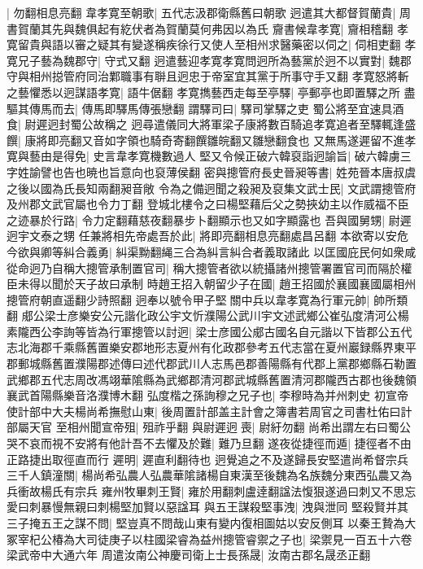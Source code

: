 |{
	勿翻相息亮翻}
韋孝寛至朝歌|{
	五代志汲郡衛縣舊曰朝歌}
迥遣其大都督賀蘭貴|{
	周書賀蘭其先與魏俱起有紇伏者為賀蘭莫何弗因以為氏}
齎書候韋孝寛|{
	齎相稽翻}
孝寛留貴與語以審之疑其有變遂稱疾徐行又使人至相州求醫藥密以伺之|{
	伺相吏翻}
孝寛兄子藝為魏郡守|{
	守式又翻}
迥遣藝迎孝寛孝寛問迥所為藝黨於迥不以實對|{
	魏郡守與相州搃管府同治鄴職事有聨且迥忠于帝室宜其黨于所事守手又翻}
孝寛怒將斬之藝懼悉以迥謀語孝寛|{
	語牛倨翻}
孝寛擕藝西走每至亭驛|{
	亭郵亭也即置驛之所}
盡驅其傳馬而去|{
	傳馬即驛馬傳張戀翻}
謂驛司曰|{
	驛司掌驛之吏}
蜀公將至宜速具酒食|{
	尉遲迥封蜀公故稱之}
迥尋遣儀同大將軍梁子康將數百騎追孝寛追者至驛輒逢盛饌|{
	康將即亮翻又音如字領也騎奇寄翻饌雛皖翻又雛戀翻食也}
又無馬遂遲留不進孝寛與藝由是得免|{
	史言韋孝寛機數過人}
堅又令候正破六韓裒詣迥諭旨|{
	破六韓虜三字姓諭譬也告也暁也旨意向也裒薄侯翻}
密與摠管府長史晉昶等書|{
	姓苑晉本唐叔虞之後以國為氏長知兩翻昶音敞}
令為之備迥聞之殺昶及裒集文武士民|{
	文武謂摠管府及州郡文武官屬也令力丁翻}
登城北樓令之曰楊堅藉后父之勢挾幼主以作威福不臣之迹暴於行路|{
	令力定翻藉慈夜翻暴步卜翻顯示也又如字顯露也}
吾與國舅甥|{
	尉遲迥宇文泰之甥}
任兼將相先帝處吾於此|{
	將即亮翻相息亮翻處昌呂翻}
本欲寄以安危今欲與卿等糾合義勇|{
	糾渠黝翻䋲三合為糾言糾合者義取諸此}
以匡國庇民何如衆咸從命迥乃自稱大摠管承制置官司|{
	稱大摠管者欲以統攝諸州摠管署置官司而隔於權臣未得以聞於天子故曰承制}
時趙王招入朝留少子在國|{
	趙王招國於襄國襄國屬相州摠管府朝直遥翻少詩照翻}
迥奉以號令甲子堅關中兵以韋孝寛為行軍元帥|{
	帥所類翻}
郕公梁士彦樂安公元諧化政公宇文忻濮陽公武川宇文述武鄉公崔弘度清河公楊素隴西公李詢等皆為行軍摠管以討迥|{
	梁士彦國公郕古國名自元諧以下皆郡公五代志北海郡千乘縣舊置樂安郡地形志夏州有化政郡參考五代志當在夏州巖録縣界東平郡郵城縣舊置濮陽郡述傳曰述代郡武川人志馬邑郡善陽縣有代郡上黨郡鄉縣石勒置武鄉郡五代志周改馮翊華隂縣為武鄉郡清河郡武城縣舊置清河郡隴西古郡也後魏領襄武首陽縣樂音洛濮博木翻}
弘度楷之孫詢穆之兄子也|{
	李穆時為并州刺史}
初宣帝使計部中大夫楊尚希撫慰山東|{
	後周置計部盖主計會之簿書若周官之司書杜佑曰計部屬天官}
至相州聞宣帝殂|{
	殂祚乎翻}
與尉遲迥喪|{
	尉紆勿翻}
尚希出謂左右曰蜀公哭不哀而視不安將有他計吾不去懼及於難|{
	難乃旦翻}
遂夜從捷徑而遁|{
	捷徑者不由正路捷出取徑直而行}
遲明|{
	遲直利翻待也}
迥覺追之不及遂歸長安堅遣尚希督宗兵三千人鎮潼關|{
	楊尚希弘農人弘農華隂諸楊自東漢至後魏為名族魏分東西弘農又為兵衝故楊氏有宗兵}
雍州牧畢刺王賢|{
	雍於用翻刺盧逹翻諡法愎狠遂過曰刺又不思忘愛曰刺暴慢無親曰刺楊堅加賢以惡諡耳}
與五王謀殺堅事洩|{
	洩與泄同}
堅殺賢并其三子掩五王之謀不問|{
	堅豈真不問哉山東有變内復相圖姑以安反側耳}
以秦王贄為大冢宰杞公椿為大司徒庚子以柱國梁睿為益州摠管睿禦之子也|{
	梁禦見一百五十六卷梁武帝中大通六年}
周遣汝南公神慶司衛上士長孫晟|{
	汝南古郡名晟丞正翻}
